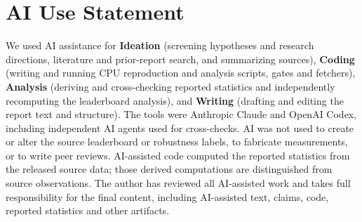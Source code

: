 \section*{AI Use Statement}

We used AI assistance for \textbf{Ideation} (screening hypotheses and research directions, literature and prior-report search, and summarizing sources), \textbf{Coding} (writing and running CPU reproduction and analysis scripts, gates and fetchers), \textbf{Analysis} (deriving and cross-checking reported statistics and independently recomputing the leaderboard analysis), and \textbf{Writing} (drafting and editing the report text and structure). The tools were Anthropic Claude and OpenAI Codex, including independent AI agents used for cross-checks. AI was not used to create or alter the source leaderboard or robustness labels, to fabricate measurements, or to write peer reviews. AI-assisted code computed the reported statistics from the released source data; those derived computations are distinguished from source observations. The author has reviewed all AI-assisted work and takes full responsibility for the final content, including AI-assisted text, claims, code, reported statistics and other artifacts.


\clearpage


